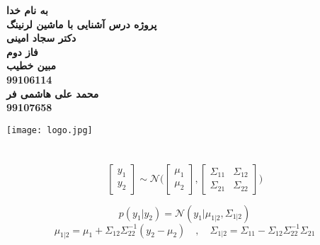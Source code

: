 

\begin{titlepage}
\begin{center}

\Huge
\textbf{به نام خدا}\\[2cm]

\huge
\textbf{ پروژه درس آشنایی با ماشین لرنینگ}\\[0.5cm]
\textbf{دکتر سجاد امینی}\\[1.5cm]
\textbf{فاز دوم}\\[1.5cm]
\Large
\textbf{مبین خطیب}\\[0.3cm]
\textbf{99106114}\\[0.5cm]
\textbf{محمد علی هاشمی فر}\\[0.3cm]
\textbf{99107658}\\[0.5cm]






\begin{center}
\texttt{[image: logo.jpg]}
\end{center}
\end{center}
\end{titlepage}

\newpage
\huge
\raggedright \section{}
\large
\[
  \begin{bmatrix}
    {y_1}\\
    {y_2}
  \end{bmatrix} \sim \mathcal{N}\Big( 
\begin{bmatrix}
  {\mu_1}\\
  {\mu_2}
\end{bmatrix} , 
\begin{bmatrix}
{\Sigma_{11}}&{\Sigma_{12}}\\
{\Sigma_{21}}&{\Sigma_{22}}
\end{bmatrix}
\Big)
\]
\raggedright {}
\[
p({y_1}|{y_2}) = \mathcal{N}({y_1}|{\mu_{1|2}}, {\Sigma_{1|2}})
\]
\begin{equation}
{\mu_{1|2}} = {\mu_{1}} +{\Sigma_{12}}{\Sigma_{22}^{-1}}({y_2} - {\mu_2})
\quad , \quad
{\Sigma_{1|2}} = {\Sigma_{11}} - {\Sigma_{12}}{\Sigma_{22}^{-1}} {\Sigma_{21}}
  \label{lemma1}
\end{equation} 


